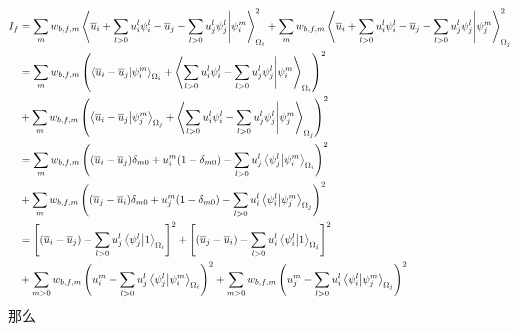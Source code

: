 \documentclass[UTF8,zihao=5]{ctexart} %
\newcommand*{\mean}[1]{\overline{#1}}
\begin{document}
$$
    \begin{aligned}
        I_f & =
        \sum_{m}
        {
            w_{b,f,m}
            \innerproduct{\mean{u}_i + \sum_{l>0}{u_i^l\psi_i^l} - \mean{u}_j - \sum_{l>0}{u_j^l\psi_j^l} }{\psi_i^m}_{\Omega_i}^2
        }
        +
        \sum_{m}
        {
            w_{b,f,m}
            \innerproduct{\mean{u}_i + \sum_{l>0}{u_i^l\psi_i^l} - \mean{u}_j - \sum_{l>0}{u_j^l\psi_j^l} }{\psi_j^m}_{\Omega_j}^2
        }          \\
            & =
        \sum_{m}
        {w_{b,f,m}\left(
            \innerproduct{\mean{u}_i - \mean{u}_j}{\psi_i^m}_{\Omega_i}
            +
            \innerproduct{\sum_{l>0}{u_i^l\psi_i^l} - \sum_{l>0}{u_j^l\psi_j^l} }{\psi_i^m}_{\Omega_i}
            \right)^2}
        \\
            & +
        \sum_{m}
        {w_{b,f,m}\left(
            \innerproduct{\mean{u}_i - \mean{u}_j}{\psi_j^m}_{\Omega_j}
            +
            \innerproduct{\sum_{l>0}{u_i^l\psi_i^l} - \sum_{l>0}{u_j^l\psi_j^l} }{\psi_j^m}_{\Omega_j}
        \right)^2} \\
            & =
        \sum_{m}
        {w_{b,f,m}\left(
            (\mean{u}_i - \mean{u}_j)\delta_{m0}
            +
            u_i^m(1-\delta_{m0})
            - \sum_{l>0}u_j^l\innerproduct{\psi_j^l}{\psi_i^m}_{\Omega_i}
            \right)^2}
        \\
            & +
        \sum_{m}
        {w_{b,f,m}\left(
            (\mean{u}_j - \mean{u}_i)\delta_{m0}
            +
            u_j^m(1-\delta_{m0})
            - \sum_{l>0}u_i^l\innerproduct{\psi_i^l}{\psi_j^m}_{\Omega_j}
        \right)^2} \\
            & =
        \left[
            (\mean{u}_i - \mean{u}_j)
            - \sum_{l>0}u_j^l\innerproduct{\psi_j^l}{1}_{\Omega_i}
            \right]^2
        +
        \left[
            (\mean{u}_j - \mean{u}_i)
            - \sum_{l>0}u_i^l\innerproduct{\psi_i^l}{1}_{\Omega_j}
        \right]^2  \\
            & +
        \sum_{m>0}
        {w_{b,f,m}\left(
            u_i^m
            - \sum_{l>0}u_j^l\innerproduct{\psi_j^l}{\psi_i^m}_{\Omega_i}
            \right)^2}
        +
        \sum_{m>0}
        {w_{b,f,m}\left(
            u_j^m
            - \sum_{l>0}u_i^l\innerproduct{\psi_i^l}{\psi_j^m}_{\Omega_j}
        \right)^2} \\
    \end{aligned}
$$
那么
\end{document}
